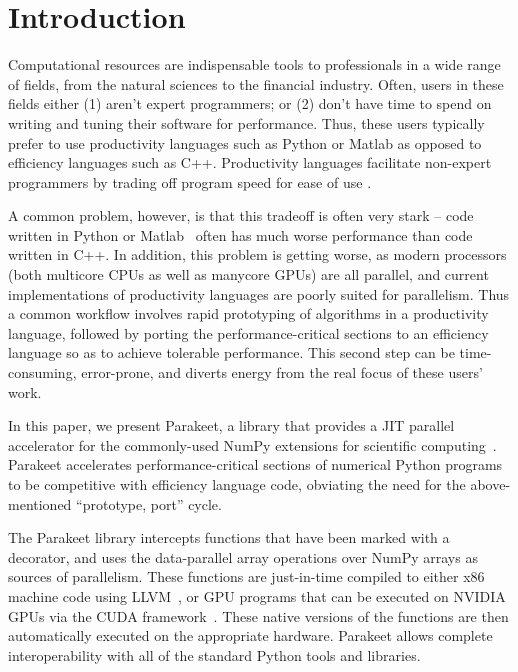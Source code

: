 \documentclass[10pt,twocolumn]{article}
\begin{document}
\section{Introduction}
\label{Intro}

Computational resources are indispensable tools to professionals in a wide range of fields, from the natural sciences to the financial industry.  Often, users in these fields either (1) aren't expert programmers; or (2) don't have time to spend on writing and tuning their software for performance.  Thus, these users typically prefer to use productivity languages such as Python or Matlab as opposed to efficiency languages such as C++.  Productivity languages facilitate non-expert programmers by trading off program speed for ease of use \cite{Pre03}.

A common problem, however, is that this tradeoff is often very stark -- code written in Python or Matlab~\cite{Moler80} often has much worse performance than code written in C++.  In addition, this problem is getting worse, as modern processors (both multicore CPUs as well as manycore GPUs) are all parallel, and current implementations of productivity languages are poorly suited for parallelism.  Thus a common workflow involves rapid prototyping of algorithms in a productivity language, followed by porting the performance-critical sections to an efficiency language so as to achieve tolerable performance.  This second step can be time-consuming, error-prone, and diverts energy from the real focus of these users' work.

In this paper, we present Parakeet, a library that provides a JIT parallel accelerator for the commonly-used NumPy extensions for scientific computing~\cite{Oliphant07}. Parakeet accelerates performance-critical sections of numerical Python programs to be competitive with efficiency language code, obviating the need for the above-mentioned ``prototype, port'' cycle.

The Parakeet library intercepts functions that have been marked with a decorator, and uses the data-parallel array operations over NumPy arrays as sources of parallelism. These functions are just-in-time compiled to either x86 machine code using LLVM~\cite{Latt02}, or GPU programs that can be executed on NVIDIA GPUs via the CUDA framework~\cite{NvidCU}. These native versions of the functions are then automatically executed on the appropriate hardware. Parakeet allows complete interoperability with all of the standard Python tools and libraries.
\end{document}

